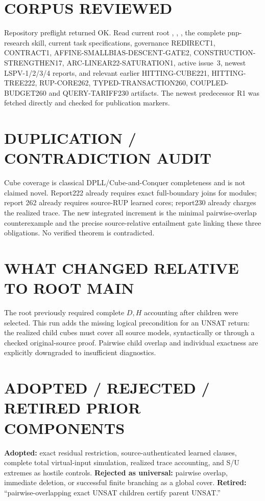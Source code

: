 \documentclass[11pt]{article}
\begin{document}
\section{CORPUS REVIEWED}
Repository preflight returned OK.  Read current root ,
, , the complete pnp-research skill, current task
specifications, governance REDIRECT1, CONTRACT1, AFFINE-SMALLBIAS-DESCENT-GATE2,
CONSTRUCTION-STRENGTHEN17, ARC-LINEAR22-SATURATION1, active issue~3, newest
LSPV-1/2/3/4 reports, and relevant earlier HITTING-CUBE221,
HITTING-TREE222, RUP-CORE262, TYPED-TRANSACTION260, COUPLED-BUDGET260 and
QUERY-TARIFF230 artifacts.  The newest predecessor R1 was fetched directly and
checked for publication markers.

\section{DUPLICATION / CONTRADICTION AUDIT}
Cube coverage is classical DPLL/Cube-and-Conquer completeness and is not claimed
novel.  Report222 already requires exact full-boundary joins for modules; report
262 already requires source-RUP learned cores; report230 already charges the
realized trace.  The new integrated increment is the minimal pairwise-overlap
counterexample and the precise source-relative entailment gate linking these
three obligations.  No verified theorem is contradicted.

\section{WHAT CHANGED RELATIVE TO ROOT MAIN}
The root previously required complete $D,H$ accounting after children were
selected.  This run adds the missing logical precondition for an UNSAT return:
the realized child cubes must cover all source models, syntactically or through
a checked original-source proof.  Pairwise child overlap and individual exactness
are explicitly downgraded to insufficient diagnostics.

\section{ADOPTED / REJECTED / RETIRED PRIOR COMPONENTS}
\textbf{Adopted:} exact residual restriction, source-authenticated learned
clauses, complete total virtual-input simulation, realized trace accounting,
and S/U extremes as hostile controls.  \textbf{Rejected as universal:}
pairwise overlap, immediate deletion, or successful finite branching as a
global cover.  \textbf{Retired:} ``pairwise-overlapping exact UNSAT children
certify parent UNSAT.''
\end{document}
